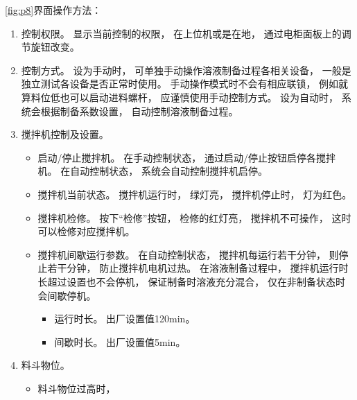 \documentclass[UTF8,a4paper,12pt,titlepage]{ctexart}
\begin{document}
      \newpage

      \ref{fig:p8}界面操作方法：
      \begin{enumerate}
         \item 控制权限。
            显示当前控制的权限，
            在上位机或是在地，
            通过电柜面板上的调节旋钮改变。
         \item 控制方式。
            设为手动时，
            可单独手动操作溶液制备过程各相关设备，
            一般是独立测试各设备是否正常时使用。
            手动操作模式时不会有相应联锁，
            例如就算料位低也可以启动进料螺杆，
            应谨慎使用手动控制方式。
            设为自动时，
            系统会根据制备系数设置，
            自动控制溶液制备过程。
         \item 搅拌机控制及设置。
            \begin{itemize}
               \item 启动/停止搅拌机。
                  在手动控制状态，
                  通过启动/停止按钮启停各搅拌机。
                  在自动控制状态，
                  系统会自动控制搅拌机启停。
               \item 搅拌机当前状态。
                  搅拌机运行时，
                  绿灯亮，
                  搅拌机停止时，
                  灯为红色。
               \item 搅拌机检修。
                  按下“检修”按钮，
                  检修的红灯亮，
                  搅拌机不可操作，
                  这时可以检修对应搅拌机。
               \item 搅拌机间歇运行参数。
                  在自动控制状态，
                  搅拌机每运行若干分钟，
                  则停止若干分钟，
                  防止搅拌机电机过热。
                  在溶液制备过程中，
                  搅拌机运行时长超过设置也不会停机，
                  保证制备时溶液充分混合，
                  仅在非制备状态时会间歇停机。
                  \begin{itemize}
                     \item 运行时长。
                        出厂设置值120min。
                     \item 间歇时长。
                        出厂设置值5min。
                  \end{itemize}
            \end{itemize}
         \item 料斗物位。
            \begin{itemize}
                \item 料斗物位过高时，

\end{itemize}
\end{enumerate}
\end{document}
